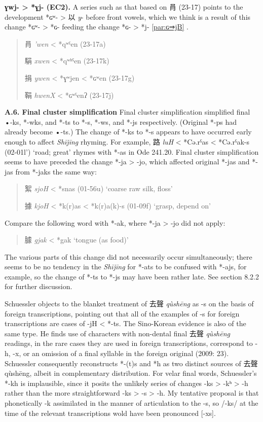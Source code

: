 \documentclass[xetex, svgnames, 12pt]{scrartcl}
\newcounter{para}
\newcommand\mypara[1]{\par\refstepcounter{para}\textbf{\thepara\space#1\space}}
\begin{document}
\mypara{*ɣwj- > *ɣj- (EC2).}
\label{par:
ɣʷj-⇒*ɣj}
A series such as that based on 肙 (23-17)  points to the development *ɢʷ- > 以 \textit{y}- before front vowels, which we think is a result of this change *ɢʷ- > *ɢ- feeding the change *ɢ- > *j- \ref{par:ɢ⇒jB} . 

\begin{quote}
肙 \textit{'wen} < *qʷˤen (23-17a)

駽 \textit{xwen} < *qʷʰˤen (23-17k)

捐 \textit{ywen} < *ɣʷjen < *ɢʷen (23-17g)

鞙 \textit{hwenX} < *ɢʷˤenʔ (23-17j)
\end{quote}
 
 
\mypara{A.6. Final cluster simplification}
 Final cluster simplification simplified final •-ks, *-wks, and *-ts to *-s, *-ws, and *-js respectively. (Original *-ps had already become •-ts.) 
 The change of *-ks to *-s appears to have occurred early enough to 
 affect \textit{Shījīng} rhyming. For example, 
 路 %
 \textit{luH} < *Cə.rˤas < *Cə.rˤak-s (02-01l') `road; great'
 rhymes with *-as in Ode 241.20.
 Final cluster simplification seems to have preceded the change 
 *-ja > -jo, which affected original *-jas and *-jas from *-jaks the same way:
 \begin{quote}
 絮 %
 \textit{sjoH} < *snas (01-56u) `coarse raw silk, floss'

 據 %
 \textit{kjoH} < *k(r)as <  *k(r)a(k)-s (01-09f) `grasp, depend on'
 \end{quote}
 Compare the following word with *-ak, where *-ja > -jo did not apply:
 \begin{quote}
 臄 %
 \textit{gjak} < *gak `tongue (as food)'
  \end{quote}
 The various parts of this change did not necessarily occur simultaneously; there seems to be
 no tendency in the \textit{Shījīng} for *-ats to be confused with *-ajs, for example, so the change of
 *-ts to *-js may have been rather late. See section 8.2.2 for further discussion.
 
 \citet[23]{Schuessler2009minimal}
 Schuessler objects to the blanket treatment of 去聲 \textit{qùshēng} as -s on the basis of foreign transcriptions,
 pointing out that all of the examples of -s for foreign transcriptions are cases of -jH < *-ts. 
 The Sino-Korean evidence is also of the same type. He finds use of characters with 
 non-dental final 去聲 \textit{qùshēng} readings, in the rare cases they are used in foreign transcriptions, 
 correspond to -h, -x, or an omission of a final syllable in the foreign original (2009: 23). 
 Schuessler consequently reconstructs *-(t)s and *h as two distinct sources of 去聲 qùshēng, 
 albeit in complementary distribution. For velar final words, Schuessler's *-kh is implausible, 
 since it posits the unlikely series of changes -ks > -kʰ > -h rather than the more 
 straightforward -ks > -s > -h. My tentative proposal is that phonetically -k assimilated
 in the manner of articulation to the -s, so /-ks/ at the time of the relevant transcriptions 
 wold have been pronounced [-xs].
\end{document}
